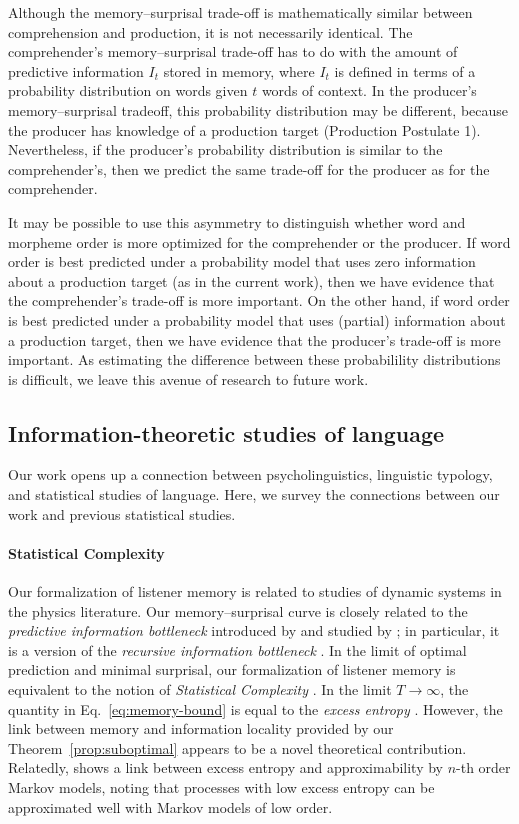 Although the memory--surprisal trade-off is mathematically similar between comprehension and production, it is not necessarily identical. The comprehender's memory--surprisal trade-off has to do with the amount of predictive information $I_t$ stored in memory, where $I_t$ is defined in terms of a probability distribution on words given $t$ words of context. In the producer's memory--surprisal tradeoff, this probability distribution may be different, because the producer has knowledge of a production target (Production Postulate 1). Nevertheless, if the producer's probability distribution is similar to the comprehender's, then we predict the same trade-off for the producer as for the comprehender.

It may be possible to use this asymmetry to distinguish whether word and morpheme order is more optimized for the comprehender or the producer. If word order is best predicted under a probability model that uses zero information about a production target (as in the current work), then we have evidence that the comprehender's trade-off is more important. On the other hand, if word order is best predicted under a probability model that uses (partial) information about a production target, then we have evidence that the producer's trade-off is more important. As estimating the difference between these probabilility distributions is difficult, we leave this avenue of research to future work.

\subsection{Information-theoretic studies of language}

Our work opens up a connection between psycholinguistics, linguistic typology, and statistical studies of language. Here, we survey the connections between our work and previous statistical studies.

\paragraph{Statistical Complexity}
Our formalization of listener memory is related to studies of dynamic systems in the physics literature.
Our memory--surprisal curve is closely related to the \emph{predictive information bottleneck} introduced by \citet{still-information-2014} and studied by \citet{marzen-predictive-2016}; in particular, it is a version of the \emph{recursive information bottleneck} \citep[][\S 4]{still-information-2014}. 
In the limit of optimal prediction and minimal surprisal, our formalization of listener memory is equivalent to the notion of \emph{Statistical Complexity} \citep{crutchfield-inferring-1989}.
In the limit $T \rightarrow \infty$, the quantity in Eq.~\ref{eq:memory-bound} is equal to the \emph{excess entropy} \citep{crutchfield-inferring-1989}.
However, the link between memory and information locality provided by our Theorem~\ref{prop:suboptimal} appears to be a novel theoretical contribution.
Relatedly, \citet{sharan-prediction-2016} shows a link between excess entropy and approximability by $n$-th order Markov models, noting that processes with low excess entropy can be approximated well with Markov models of low order.



